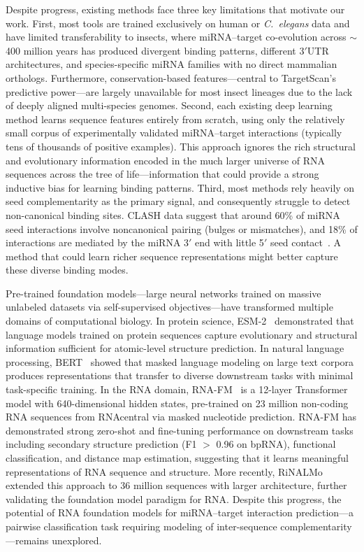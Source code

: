 \documentclass[10pt,a4paper]{article}
\begin{document}
Despite progress, existing methods face three key limitations that motivate our work. First, most tools are trained exclusively on human or \textit{C.\ elegans} data and have limited transferability to insects, where miRNA--target co-evolution across $\sim$400 million years has produced divergent binding patterns, different 3$'$UTR architectures, and species-specific miRNA families with no direct mammalian orthologs. Furthermore, conservation-based features---central to TargetScan's predictive power---are largely unavailable for most insect lineages due to the lack of deeply aligned multi-species genomes. Second, each existing deep learning method learns sequence features entirely from scratch, using only the relatively small corpus of experimentally validated miRNA--target interactions (typically tens of thousands of positive examples). This approach ignores the rich structural and evolutionary information encoded in the much larger universe of RNA sequences across the tree of life---information that could provide a strong inductive bias for learning binding patterns. Third, most methods rely heavily on seed complementarity as the primary signal, and consequently struggle to detect non-canonical binding sites. CLASH data suggest that around 60\% of miRNA seed interactions involve noncanonical pairing (bulges or mismatches), and 18\% of interactions are mediated by the miRNA 3$'$ end with little 5$'$ seed contact~\citep{helwak2013clash}. A method that could learn richer sequence representations might better capture these diverse binding modes.

Pre-trained foundation models---large neural networks trained on massive unlabeled datasets via self-supervised objectives---have transformed multiple domains of computational biology. In protein science, ESM-2~\citep{lin2023esm} demonstrated that language models trained on protein sequences capture evolutionary and structural information sufficient for atomic-level structure prediction. In natural language processing, BERT~\citep{devlin2019bert} showed that masked language modeling on large text corpora produces representations that transfer to diverse downstream tasks with minimal task-specific training. In the RNA domain, RNA-FM~\citep{chen2022rnafm} is a 12-layer Transformer model with 640-dimensional hidden states, pre-trained on 23 million non-coding RNA sequences from RNAcentral via masked nucleotide prediction. RNA-FM has demonstrated strong zero-shot and fine-tuning performance on downstream tasks including secondary structure prediction (F1 $>$ 0.96 on bpRNA), functional classification, and distance map estimation, suggesting that it learns meaningful representations of RNA sequence and structure. More recently, RiNALMo~\citep{rinalmo2025} extended this approach to 36 million sequences with larger architecture, further validating the foundation model paradigm for RNA. Despite this progress, the potential of RNA foundation models for miRNA--target interaction prediction---a pairwise classification task requiring modeling of inter-sequence complementarity---remains unexplored.
\end{document}
